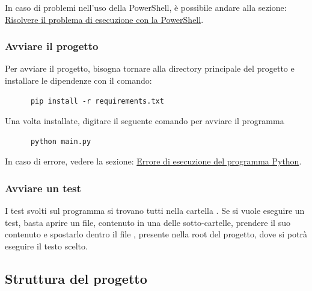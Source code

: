 \documentclass[12pt, letterpaper]{article}
\begin{document}
\noindent In caso di problemi nell'uso della PowerShell, è possibile andare alla
sezione: \hyperref[sec:powershell-error]{Risolvere il problema di esecuzione con la PowerShell}. \\

\subsubsection{Avviare il progetto}

Per avviare il progetto, bisogna tornare alla directory principale del progetto e installare
le dipendenze con il comando: \\

\begin{verbatim}
      pip install -r requirements.txt
\end{verbatim}

\noindent Una volta installate, digitare il seguente comando per avviare il programma

\begin{verbatim}
      python main.py
\end{verbatim}

\noindent In caso di errore, vedere la sezione:
\hyperref[sec:python-error]{Errore di esecuzione del programma Python}.

\subsubsection{Avviare un test}

I test svolti sul programma si trovano tutti nella cartella . Se si vuole eseguire un
test, basta aprire un file, contenuto in una delle sotto-cartelle, prendere il suo contenuto e spostarlo
dentro il file , presente nella root del progetto, dove si potrà eseguire il testo scelto.

\subsection{Struttura del progetto}
\end{document}
